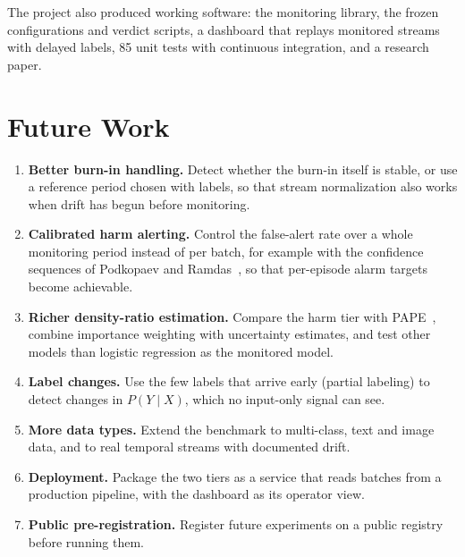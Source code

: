 The project also produced working software: the monitoring library, the frozen configurations and verdict scripts, a dashboard that replays monitored streams with delayed labels, 85 unit tests with continuous integration, and a research paper.

\section{Future Work}
\begin{enumerate}
\item \textbf{Better burn-in handling.} Detect whether the burn-in itself is stable, or use a reference period chosen with labels, so that stream normalization also works when drift has begun before monitoring.
\item \textbf{Calibrated harm alerting.} Control the false-alert rate over a whole monitoring period instead of per batch, for example with the confidence sequences of Podkopaev and Ramdas~\cite{podkopaev2022tracking}, so that per-episode alarm targets become achievable.
\item \textbf{Richer density-ratio estimation.} Compare the harm tier with PAPE~\cite{bialek2025pape}, combine importance weighting with uncertainty estimates, and test other models than logistic regression as the monitored model.
\item \textbf{Label changes.} Use the few labels that arrive early (partial labeling) to detect changes in $P(Y\mid X)$, which no input-only signal can see.
\item \textbf{More data types.} Extend the benchmark to multi-class, text and image data, and to real temporal streams with documented drift.
\item \textbf{Deployment.} Package the two tiers as a service that reads batches from a production pipeline, with the dashboard as its operator view.
\item \textbf{Public pre-registration.} Register future experiments on a public registry before running them.
\end{enumerate}
